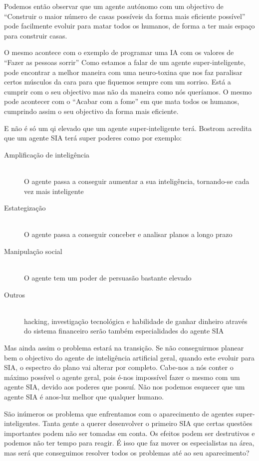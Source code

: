 \documentclass[runningheads,a4paper]{llncs}
\begin{document}
Podemos então observar que um agente autónomo com um objectivo de ``Construir o maior número de casas possíveis da forma mais eficiente possível'' pode facilmente evoluir para matar todos os humanos, de forma a ter mais espaço para construir casas.

O mesmo acontece com o exemplo de programar uma IA com os valores de ``Fazer as pessoas sorrir'' Como estamos a falar de um agente super-inteligente, pode encontrar a melhor maneira com uma neuro-toxina que nos faz paralisar certos músculos da cara para que fiquemos sempre com um sorriso. Está a cumprir com o seu objectivo mas não da maneira como nós queríamos. O mesmo pode acontecer com o ``Acabar com a fome'' em que mata todos os humanos, cumprindo assim o seu objectivo da forma mais eficiente.

E não é só um qi elevado que um agente super-inteligente terá. Bostrom\cite{supint} acredita que um agente SIA terá super poderes como por exemplo:

\begin{description}

  \item[Amplificação de inteligência] \hfill \\
    O agente passa a conseguir aumentar a sua inteligência, tornando-se cada vez mais inteligente
  \item[Estategização] \hfill \\
    O agente passa a conseguir conceber e analisar planos a longo prazo
  \item[Manipulação social] \hfill \\
    O agente tem um poder de persuasão bastante elevado
  \item[Outros] \hfill \\
    hacking, investigação tecnológica e habilidade de ganhar dinheiro através do sistema financeiro serão também especialidades do agente SIA

\end{description}

Mas ainda assim o problema estará na transição. Se não conseguirmos planear bem o objectivo do agente de inteligência artificial geral, quando este evoluir para SIA, o espectro do plano vai alterar por completo. Cabe-nos a nós conter o máximo possível o agente geral, pois é-nos impossível fazer o mesmo com um agente SIA, devido aos poderes que possuí. Não nos podemos esquecer que um agente SIA é anos-luz melhor que qualquer humano.

São inúmeros os problema que enfrentamos com o aparecimento de agentes super-inteligentes. Tanta gente a querer desenvolver o primeiro SIA que certas questões importantes podem não ser tomadas em conta. Os efeitos podem ser destrutivos e podemos não ter tempo para reagir. É isso que faz mover os especialistas na área, mas será que conseguimos resolver todos os problemas até ao seu aparecimento?
\end{document}
